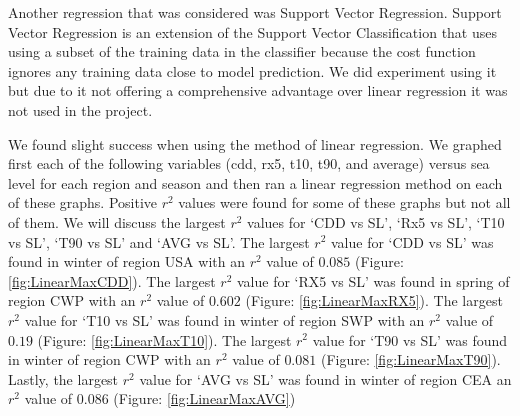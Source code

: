 \documentclass[12pt]{report}
\begin{document}
\par Another regression that was considered was Support Vector Regression. Support Vector Regression is an extension of the Support Vector Classification that uses using a subset of the training data in the classifier because the cost function ignores any training data close to model prediction. We did experiment using it but due to it not offering a comprehensive advantage over linear regression it was not used in the project.
	\par We found slight success when using the method of linear regression. We graphed first each of the following variables (cdd, rx5, t10, t90, and average) versus sea level for each region and season and then ran a linear regression method on each of these graphs. Positive $r^2$ values were found for some of these graphs but not all of them. We will discuss the largest $r^2$ values for \textquoteleft CDD vs SL', \textquoteleft Rx5 vs SL', \textquoteleft T10 vs SL', \textquoteleft T90 vs SL' and \textquoteleft AVG vs SL'. The largest $r^2$ value for \textquoteleft CDD vs SL' was found in winter of region USA with an $r^2$ value of $0.085$ (Figure: \ref{fig:LinearMaxCDD}). The largest $r^2$ value for \textquoteleft RX5 vs SL' was found in spring of region CWP with an $r^2$ value of $0.602$ (Figure: \ref{fig:LinearMaxRX5}). The largest $r^2$ value for \textquoteleft T10 vs SL' was found in winter of region SWP with an $r^2$ value of $0.19$ (Figure: \ref{fig:LinearMaxT10}). The largest $r^2$ value for \textquoteleft T90 vs SL' was found in winter of region CWP with an $r^2$ value of $0.081$ (Figure: \ref{fig:LinearMaxT90}). Lastly, the largest $r^2$ value for \textquoteleft AVG vs SL' was found in winter of region CEA an $r^2$ value of $0.086$ (Figure: \ref{fig:LinearMaxAVG})
\end{document}
